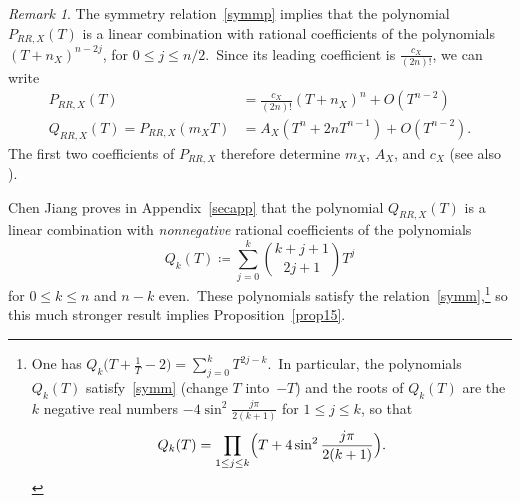 \documentclass[12pt]{amsart}
\theoremstyle{remark}
\newtheorem{rema}[lemm]{Remark}
\begin{document}
 \begin{rema}\label{rema22}
 The symmetry relation~\eqref{symmp} implies that the polynomial $P_{RR,X}(T)$ is a linear combination with rational coefficients of the polynomials  $(T+n_X)^{n-2j}$, for $0\le j\le n/2$.\ Since its leading coefficient is $\frac{c_X}{(2n)!}$, we can write
 \begin{equation}\label{jc}
\begin{aligned} 
P_{RR,X}(T)&=\frac{c_X}{(2n)!} (T+n_X)^n +O(T^{n-2})\\
Q_{RR,X}(T)=P_{RR,X}(m_XT) &= A_X( T^n+2n T^{n-1} )+ O(T^{n-2}).
\end{aligned}
\end{equation}
The first two coefficients of $P_{RR,X}$ therefore determine $m_X$, $A_X$, and 
$c_X$ (see also \cite[Lemma~5.7]{jia}).
 
 
 Chen Jiang proves in Appendix~\ref{secapp}  that the polynomial $ Q_{RR,X}(T) $ is     a linear combination with {\em nonnegative} rational coefficients of the  polynomials
 $$Q_k(T)\coloneqq\sum_{j=0}^{k}\binom{k+j+1}{2j+1}T^j%
 $$
 for $0\le k\le n$ and $n-k$ even.\ These polynomials satisfy the relation~\eqref{symm},\footnote{One has
 $Q_k\bigl(T+\tfrac1{T}-2\bigr) =\sum_{j=0}^kT^{2j-k}$.\ 
In particular, the polynomials $Q_k(T)$  satisfy~\eqref{symm} (change $T$ into~$-T$) and the roots of $Q_k(T)$ are the $k$ negative real numbers $-4\sin^2\frac{j\pi}{2(k+1)}$ for $1\le j\le k$, so that
$$Q_k(T)=\prod_{1\le j\le k}\Bigl(T+ 4\sin^2\frac{j\pi}{2(k+1)}\Bigr)
.$$
} so this much stronger  result implies Proposition~\ref{prop15}. 
  \end{rema}
 
\end{document}
